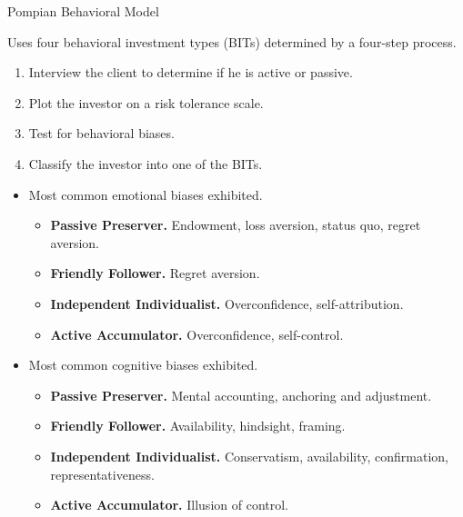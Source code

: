 \documentclass[../custom]{flashcards}
\newcommand{\studyArea}{Behavioral Finance}
\begin{document}
\begin{flashcard}[\studyArea]{Pompian Behavioral Model}
    \begin{flushleft}
        Uses four behavioral investment types (BITs) determined by a four-step process.
        \begin{enumerate}
            \item Interview the client to determine if he is active or passive.
            \item Plot the investor on a risk tolerance scale.
            \item Test for behavioral biases.
            \item Classify the investor into one of the BITs.
        \end{enumerate}
        \begin{itemize}[nosep]
            \item Most common emotional biases exhibited.
                \begin{itemize}
                    \item \textbf{Passive Preserver.} Endowment, loss aversion, status quo, regret aversion.
                    \item \textbf{Friendly Follower.} Regret aversion.
                    \item \textbf{Independent Individualist.} Overconfidence, self-attribution.
                    \item \textbf{Active Accumulator.} Overconfidence, self-control.
                \end{itemize}
            \item Most common cognitive biases exhibited.
                \begin{itemize}
                    \item \textbf{Passive Preserver.} Mental accounting, anchoring and adjustment.
                    \item \textbf{Friendly Follower.} Availability, hindsight, framing.
                    \item \textbf{Independent Individualist.} Conservatism, availability, confirmation, representativeness.
                    \item \textbf{Active Accumulator.} Illusion of control.
                \end{itemize}
        \end{itemize}
    \end{flushleft}
\end{flashcard}
\end{document}
